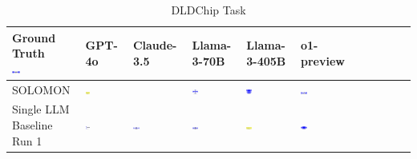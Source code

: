 \begin{table}
  \caption{DLDChip Task}
  \label{table:dldchip}
  \centering
  \begin{tabular}{@{}mmmmmm@{}}
    \toprule
    \makecell{Ground Truth \\ \includegraphics[width=0.13\textwidth]{examples_png/DLDChip.png}} & GPT-4o & Claude-3.5 & Llama-3-70B & Llama-3-405B & o1-preview \\
    \midrule
    SOLOMON & \includegraphics[width=0.13\textwidth]{./pool_all/png/gpt-4o_results/DLDChip.png} &  & \includegraphics[width=0.13\textwidth]{./pool_all/png/claude-3-5-sonnet-20240620_results/DLDChip.png} & \includegraphics[width=0.13\textwidth]{./pool_all/png/watsonx_meta-llama_llama-3-1-70b-instruct_results/DLDChip.png} & \includegraphics[width=0.13\textwidth]{./pool_all/png/watsonx_meta-llama_llama-3-405b-instruct_results/DLDChip.png} \\
    \makecell{Single LLM \\ Baseline \\ Run 1} & \includegraphics[width=0.13\textwidth]{./run_1/png/gpt-4o_results/DLDChip.png} & \includegraphics[width=0.13\textwidth]{./run_1/png/o1-preview_results/DLDChip.png} & \includegraphics[width=0.13\textwidth]{./run_1/png/claude-3-5-sonnet-20240620_results/DLDChip.png} & \includegraphics[width=0.13\textwidth]{./run_1/png/watsonx_meta-llama_llama-3-1-70b-instruct_results/DLDChip.png} & \includegraphics[width=0.13\textwidth]{./run_1/png/watsonx_meta-llama_llama-3-405b-instruct_results/DLDChip.png} \\

\end{tabular}
\end{table}
